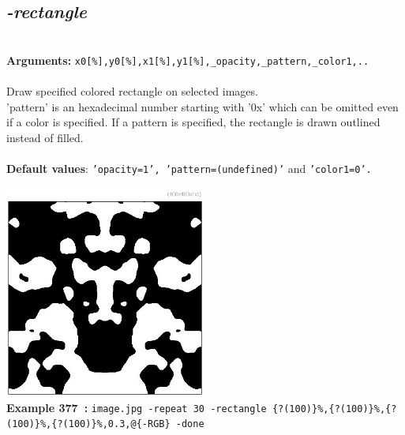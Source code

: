 \documentclass[a4paper,11pt,twoside]{book}
\begin{document}
\subsection{\emph{-rectangle} }\vspace*{-0.5em}
~\\\textbf{Arguments: } 
{\small \texttt{x0[\%],y0[\%],x1[\%],y1[\%],\_opacity,\_pattern,\_color1,..}}\\~\\
Draw specified colored rectangle on selected images.
~\\'pattern' is an hexadecimal number starting with '0x' which can be omitted
even if a color is specified. If a pattern is specified, the rectangle is
drawn outlined instead of filled.
~\\~\\\textbf{Default values}: {\small \texttt{'opacity=1', 'pattern=(undefined)'} and \texttt{'color1=0'.}}
\begin{center}\includegraphics[keepaspectratio=true,height=7cm,width=\textwidth]{img/gmic_def377.jpg}\\
{\footnotesize \textbf{Example 377~:} \texttt{image.jpg -repeat 30 -rectangle \{?(100)\}\%,\{?(100)\}\%,\{?(100)\}\%,\{?(100)\}\%,0.3,@\{-RGB\} -done}}
\end{center}
\end{document}
